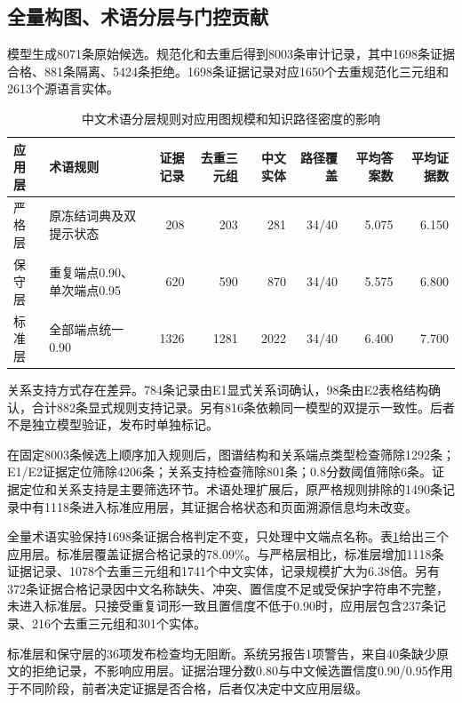 \documentclass[conference,a4paper]{IEEEtran}
\begin{document}
\subsection{全量构图、术语分层与门控贡献}

模型生成8071条原始候选。规范化和去重后得到8003条审计记录，其中1698条证据合格、881条隔离、5424条拒绝。1698条证据记录对应1650个去重规范化三元组和2613个源语言实体。

\begin{table}[!t]
\caption{中文术语分层规则对应用图规模和知识路径密度的影响}
\label{tab:tiers}
\centering
\footnotesize
\begin{tabularx}{\textwidth}{l>{\raggedright\arraybackslash}Xrrrrrr}
\toprule
应用层 & 术语规则 & 证据记录 & 去重三元组 & 中文实体 & 路径覆盖 & 平均答案数 & 平均证据数 \\
\midrule
严格层 & 原冻结词典及双提示状态 & 208  & 203  & 281  & 34/40 & 5.075 & 6.150 \\
保守层 & 重复端点0.90、单次端点0.95 & 620  & 590  & 870  & 34/40 & 5.575 & 6.800 \\
标准层 & 全部端点统一0.90 & 1326 & 1281 & 2022 & 34/40 & 6.400 & 7.700 \\
\bottomrule
\end{tabularx}
\end{table}

关系支持方式存在差异。784条记录由E1显式关系词确认，98条由E2表格结构确认，合计882条显式规则支持记录。另有816条依赖同一模型的双提示一致性。后者不是独立模型验证，发布时单独标记。

在固定8003条候选上顺序加入规则后，图谱结构和关系端点类型检查筛除1292条；E1/E2证据定位筛除4206条；关系支持检查筛除801条；0.8分数阈值筛除6条。证据定位和关系支持是主要筛选环节。术语处理扩展后，原严格规则排除的1490条记录中有1118条进入标准应用层，其证据合格状态和页面溯源信息均未改变。

全量术语实验保持1698条证据合格判定不变，只处理中文端点名称。表\ref{tab:tiers}给出三个应用层。标准层覆盖证据合格记录的78.09\%。与严格层相比，标准层增加1118条证据记录、1078个去重三元组和1741个中文实体，记录规模扩大为6.38倍。另有372条证据合格记录因中文名称缺失、冲突、置信度不足或受保护字符串不完整，未进入标准层。只接受重复词形一致且置信度不低于0.90时，应用层包含237条记录、216个去重三元组和301个实体。

标准层和保守层的36项发布检查均无阻断。系统另报告1项警告，来自40条缺少原文的拒绝记录，不影响应用层。证据治理分数0.80与中文候选置信度0.90/0.95作用于不同阶段，前者决定证据是否合格，后者仅决定中文应用层级。
\end{document}
